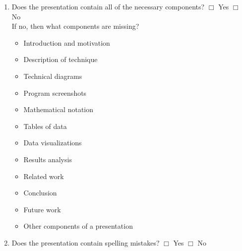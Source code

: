\documentclass[letterpaper, 10pt]{article} %
\begin{document}
{\begin{enumerate}

\item Does the presentation contain all of the necessary
  components? \hspace*{.05in} $\Box$ Yes
  \hspace*{.05in} $\Box$ No \\ \hspace*{.05in} If no, then what
  components are missing? \vspace*{-.05in}

\begin{itemize}
\renewcommand{\labelitemi}{$\Box$}

\setlength{\itemsep}{.5pt}

\item Introduction and motivation

\item Description of technique 

\item Technical diagrams

\item Program screenshots

\item Mathematical notation

\item Tables of data

\item Data visualizations

\item Results analysis

\item Related work 

\item Conclusion 

\item Future work 

\item Other components of a presentation

\end{itemize}

\item Does the presentation contain spelling mistakes? \hspace*{.05in}
  $\Box$ Yes \hspace*{.05in} $\Box$ No


\end{enumerate}}
\end{document}
